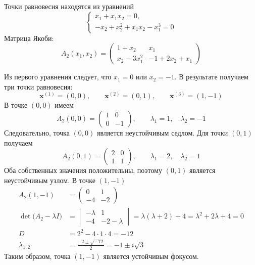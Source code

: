 Точки равновесия находятся из уравнений
\begin{equation}
  \begin{cases}
    x_1+x_1x_2=0,\\
    -x_2+x_2^2+x_1x_2-x_1^3=0
  \end{cases}
\end{equation}
Матрица Якоби:
\begin{equation}
  A_2(x_1,x_2)=
  \begin{pmatrix}
    1+x_2 & x_1\\
    x_2-3x_1^2 & -1+2x_2+x_1
  \end{pmatrix}
\end{equation}

Из первого уравнения следует, что $x_1=0$ или $x_2=-1$. В результате
получаем три точки равновесия:
\begin{equation}
  \bm x^{(1)}=(0,0),\qquad
  \bm x^{(2)}=(0,1),\qquad
  \bm x^{(3)}=(1,-1)
\end{equation}
В точке $(0,0)$ имеем
\begin{equation}
  A_2(0,0)=
  \begin{pmatrix}
    1 & 0\\
    0 & -1
  \end{pmatrix},
  \qquad
  \lambda_1=1,\quad\lambda_2=-1
\end{equation}
Следовательно, точка $(0,0)$ является неустойчивым седлом. Для точки
$(0,1)$ получаем
\begin{equation}
  A_2(0,1)=
  \begin{pmatrix}
    2 & 0\\
    1 & 1
  \end{pmatrix},
  \qquad
  \lambda_1=2,\quad\lambda_2=1
\end{equation}
Оба собственных значения положительны, поэтому $(0,1)$ является
неустойчивым узлом. В точке $(1,-1)$
\begin{equation}
  \begin{aligned}
    A_2(1,-1)&=
    \begin{pmatrix}
      0 & 1\\
      -4 & -2
    \end{pmatrix}\\
    \det\bigl(A_2-\lambda I\bigr)
    &=
    \begin{vmatrix}
      -\lambda & 1\\
      -4 & -2-\lambda
    \end{vmatrix}
    =\lambda(\lambda+2)+4
    =\lambda^2+2\lambda+4=0\\
    D&=2^2-4\cdot 1\cdot 4=-12\\
    \lambda_{1,2}
    &=\frac{-2\pm\sqrt{-12}}{2}
    =-1\pm i\sqrt{3}
  \end{aligned}
\end{equation}
Таким образом, точка $(1,-1)$ является устойчивым фокусом.

